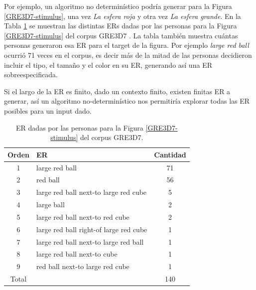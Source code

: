 Por ejemplo, un algoritmo no determin\'istico podr\'ia generar para la Figura \ref{GRE3D7-stimulus}, una vez {\it La esfera roja} y otra vez {\it La esfera grande}. En la Tabla \ref{er-gre3d7-stimulus} se muestran las distintas ERs dadas por las personas para la Figura \ref{GRE3D7-stimulus} del corpus GRE3D7 \cite{gre3d7}. La tabla tambi\'en muestra cu\'antas personas generaron esa ER para el target de la figura. Por ejemplo {\it large red ball} ocurri\'o 71 veces en el corpus, es decir m\'as de la mitad de las personas decidieron incluir el tipo, el tama\~no y el color en su ER, generando as\'i una ER sobreespecificada.

Si el largo de la ER es finito, dado un contexto finito, existen finitas ER a generar, as\'i un algoritmo no-determin\'istico nos permitir\'ia explorar todas las ER posibles para un input dado.

\begin{table}[h!]
\begin{center}
\begin{tabular}{|c|l|c|}
\hline
 Orden&ER& Cantidad \\
\hline
1&large red ball & 71 \\
2&red ball & 56 \\ 
3&large red ball next-to large red cube & 5 \\ 
4&large ball & 2 \\ 
5&large red ball next-to red cube & 2 \\ 
6&large red ball right-of large red cube & 1 \\ 
7&large red ball next-to large red ball & 1 \\ 
8&large red ball next-to cube & 1 \\ 
9&red ball next-to large red cube & 1 \\ \hline
Total & &140 \\ \hline
\end{tabular}
\caption{ER dadas por las personas para la Figura \ref{GRE3D7-stimulus} del corpus GRE3D7.} 
\label{er-gre3d7-stimulus}
\vspace*{-.5cm}
\end{center}
\end{table}

